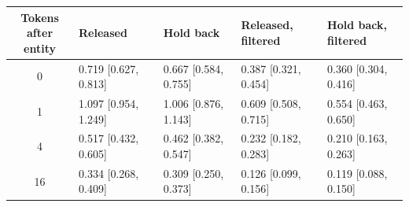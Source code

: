 \begin{tabular}{@{}cllll@{}}
\toprule
\shortstack[l]{Tokens after\\entity} & Released & Hold back & \shortstack[l]{Released,\\filtered} & \shortstack[l]{Hold back,\\filtered} \\
\midrule
0 & 0.719 {\scriptsize[0.627, 0.813]} & 0.667 {\scriptsize[0.584, 0.755]} & 0.387 {\scriptsize[0.321, 0.454]} & 0.360 {\scriptsize[0.304, 0.416]} \\
1 & 1.097 {\scriptsize[0.954, 1.249]} & 1.006 {\scriptsize[0.876, 1.143]} & 0.609 {\scriptsize[0.508, 0.715]} & 0.554 {\scriptsize[0.463, 0.650]} \\
4 & 0.517 {\scriptsize[0.432, 0.605]} & 0.462 {\scriptsize[0.382, 0.547]} & 0.232 {\scriptsize[0.182, 0.283]} & 0.210 {\scriptsize[0.163, 0.263]} \\
16 & 0.334 {\scriptsize[0.268, 0.409]} & 0.309 {\scriptsize[0.250, 0.373]} & 0.126 {\scriptsize[0.099, 0.156]} & 0.119 {\scriptsize[0.088, 0.150]} \\
\bottomrule
\end{tabular}
